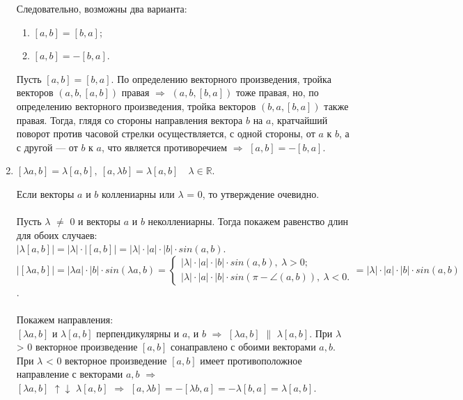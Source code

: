 \begin{enumerate}
\begin{Proof}
\begin{center}
		\end{center}
		Следовательно, возможны два варианта:
		\begin{enumerate}
			\item $[a, b] = [b, a]$;
			\item $[a, b] = -[b, a]$.
		\end{enumerate}
		Пусть $[a, b] = [b, a]$. По определению векторного произведения, тройка векторов $(a, b, [a, b])$ правая $\Rightarrow$ $(a, b, [b, a])$ тоже правая, но, по определению векторного произведения, тройка векторов $(b, a, [b, a])$ также правая. Тогда, глядя со стороны направления вектора $b$ на $a$, кратчайший поворот против часовой стрелки осуществляется, с одной стороны, от $a$ к $b$, а с другой --- от $b$ к $a$, что является противоречием $\Rightarrow$ $[a, b] = -[b, a]$.
	\end{Proof}
	\item $[\lambda a, b] = \lambda[a, b],\ [a, \lambda b] = \lambda[a, b]\quad \lambda \in \mathbb{R}.$
	\begin{Proof}
		Если векторы $a$ и $b$ коллениарны или $\lambda$ = 0, то утверждение очевидно.\\\\
		Пусть $\lambda$ $\not=$ 0 и векторы $a$ и $b$ неколлениарны. Тогда покажем равенство длин для обоих случаев:\\
		$|\lambda[a, b]| = |\lambda|\cdot|[a, b]| = |\lambda|\cdot|a|\cdot|b|\cdot sin(a, b)$. \\
		$|[\lambda a, b]| = |\lambda a|\cdot|b|\cdot sin(\lambda a, b) = \begin{cases} |\lambda|\cdot|a|\cdot|b|\cdot sin (a, b),\ \lambda > 0; \\  |\lambda|\cdot|a|\cdot|b|\cdot sin (\pi - \angle (a, b)),\ \lambda < 0.\end{cases} = |\lambda|\cdot|a|\cdot|b|\cdot sin (a, b)$. \\\\
		Покажем направления: \\
		$[\lambda a, b]$ и $\lambda[a, b]$ перпендикулярны и $a$, и $b$ $\Rightarrow$ $[\lambda a, b]$ $\parallel$ $\lambda[a, b]$. При $\lambda$ > 0 векторное произведение $[a, b]$ сонаправлено с обоими векторами $a, b$. \\
		При $\lambda$ < 0 векторное произведение $[a, b]$ имеет противоположное направление с векторами $a, b$ $\Rightarrow$ \\ $[\lambda a, b]$ $\uparrow\downarrow$ $\lambda[a, b]$ $\Rightarrow$ $[a, \lambda b] = -[\lambda b, a] = -\lambda [b, a] = \lambda [a, b]$.

\end{Proof}
\end{enumerate}
